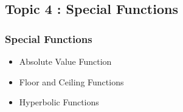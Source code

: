 \documentclass{beamer}
\begin{document}
\subsection*{Topic 4 : Special Functions}
\begin{frame}
	\frametitle{Special Functions}
	\begin{itemize}
		\item Absolute Value Function
		\item Floor and Ceiling Functions
		\item Hyperbolic Functions
	\end{itemize}	
\end{frame}
\end{document}
